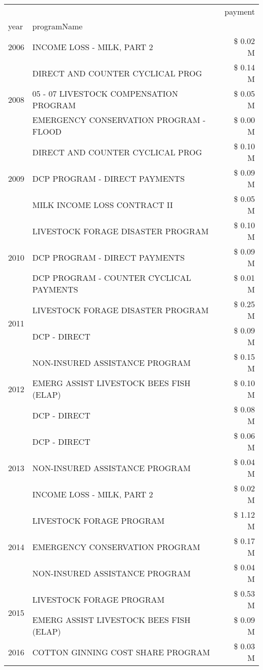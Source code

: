\begin{tabular}{llr}
\toprule
 &  & payment \\
year & programName &  \\
\midrule
2006 & INCOME LOSS - MILK, PART 2 & \$ 0.02 M \\
\cline{1-3}
\multirow[t]{3}{*}{2008} & DIRECT AND COUNTER CYCLICAL PROG & \$ 0.14 M \\
 & 05 - 07 LIVESTOCK COMPENSATION PROGRAM & \$ 0.05 M \\
 & EMERGENCY CONSERVATION PROGRAM - FLOOD & \$ 0.00 M \\
\cline{1-3}
\multirow[t]{3}{*}{2009} & DIRECT AND COUNTER CYCLICAL PROG & \$ 0.10 M \\
 & DCP PROGRAM - DIRECT PAYMENTS & \$ 0.09 M \\
 & MILK INCOME LOSS CONTRACT II & \$ 0.05 M \\
\cline{1-3}
\multirow[t]{3}{*}{2010} & LIVESTOCK FORAGE DISASTER  PROGRAM & \$ 0.10 M \\
 & DCP PROGRAM - DIRECT PAYMENTS & \$ 0.09 M \\
 & DCP PROGRAM - COUNTER CYCLICAL PAYMENTS & \$ 0.01 M \\
\cline{1-3}
\multirow[t]{2}{*}{2011} & LIVESTOCK FORAGE DISASTER PROGRAM & \$ 0.25 M \\
 & DCP - DIRECT & \$ 0.09 M \\
\cline{1-3}
\multirow[t]{3}{*}{2012} & NON-INSURED ASSISTANCE PROGRAM & \$ 0.15 M \\
 & EMERG ASSIST LIVESTOCK BEES FISH (ELAP) & \$ 0.10 M \\
 & DCP - DIRECT & \$ 0.08 M \\
\cline{1-3}
\multirow[t]{3}{*}{2013} & DCP - DIRECT & \$ 0.06 M \\
 & NON-INSURED ASSISTANCE PROGRAM & \$ 0.04 M \\
 & INCOME LOSS - MILK, PART 2 & \$ 0.02 M \\
\cline{1-3}
\multirow[t]{3}{*}{2014} & LIVESTOCK FORAGE PROGRAM & \$ 1.12 M \\
 & EMERGENCY CONSERVATION PROGRAM & \$ 0.17 M \\
 & NON-INSURED ASSISTANCE PROGRAM & \$ 0.04 M \\
\cline{1-3}
\multirow[t]{2}{*}{2015} & LIVESTOCK FORAGE PROGRAM & \$ 0.53 M \\
 & EMERG ASSIST LIVESTOCK BEES FISH (ELAP) & \$ 0.09 M \\
\cline{1-3}
\multirow[t]{3}{*}{2016} & COTTON GINNING COST SHARE PROGRAM             & \$ 0.03 M \\

\end{tabular}
